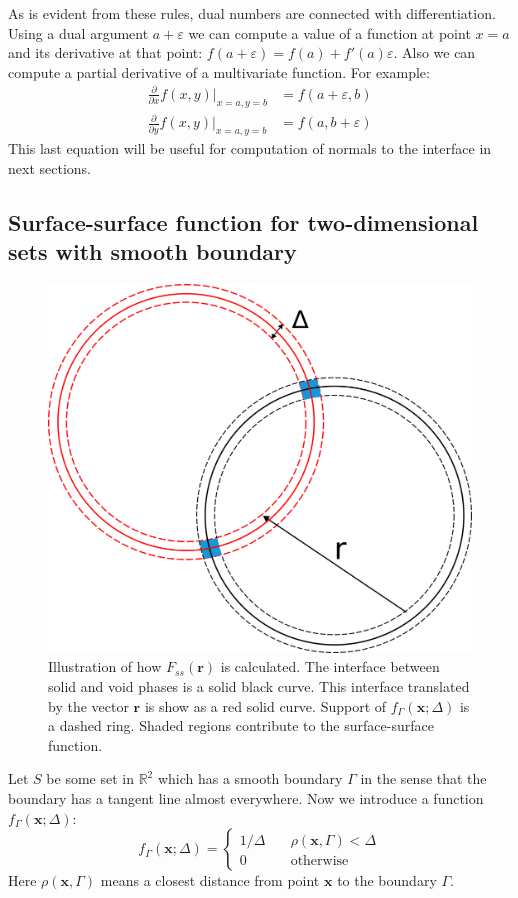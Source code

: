 \documentclass[reprint,amsmath,amssymb,aps,pre,showkeys,showpacs]{revtex4-1}
\begin{document}
As is evident from these rules, dual numbers are connected with
differentiation. Using a dual argument $a + \varepsilon$ we can compute a value
of a function at point $x = a$ and its derivative at that point:
$f(a + \varepsilon) = f(a) + f'(a)\varepsilon$. Also we can compute a partial
derivative of a multivariate function. For example:
\begin{equation}
  \begin{aligned}
    \frac{\partial}{\partial x} f(x, y) \vert_{x = a, y = b} &= f(a + \varepsilon,
    b) \\
    \frac{\partial}{\partial y} f(x, y) \vert_{x = a, y = b} &= f(a, b +
    \varepsilon)
  \end{aligned}
  \label{eq:autonormals}
\end{equation}
This last equation will be useful for computation of normals to the interface in
next sections.

\subsection{Surface-surface function for two-dimensional sets with smooth boundary}
\label{sec:fss-2d}
\begin{figure}
  \centering
  \includegraphics[width=0.8\linewidth]{images/Fss.png}
  \caption[]{Illustration of how $F_{ss}(\bm{r})$ is calculated. The interface
    between solid and void phases is a solid black curve. This interface
    translated by the vector $\bm{r}$ is show as a red solid curve. Support of
    $f_\Gamma(\bm{x}; \Delta)$ is a dashed ring. Shaded regions contribute to
    the surface-surface function.}
  \label{fig:Fss-explained}
\end{figure}
Let $S$ be some set in $\mathbb{R}^2$ which has a smooth boundary $\Gamma$ in
the sense that the boundary has a tangent line almost everywhere. Now we
introduce a function $f_\Gamma(\bm{x}; \Delta)$:
\begin{equation}
  f_\Gamma(\bm{x}; \Delta) = \left\{
  \begin{array}{ll}
    1/\Delta & \quad \rho(\bm{x}, \Gamma) < \Delta \\
    0 & \quad \text{otherwise}
  \end{array}
  \right. \label{eq:delta-sequence}
\end{equation}
Here $\rho(\bm{x}, \Gamma)$ means a closest distance from point $\bm{x}$ to the
boundary $\Gamma$.
\end{document}
